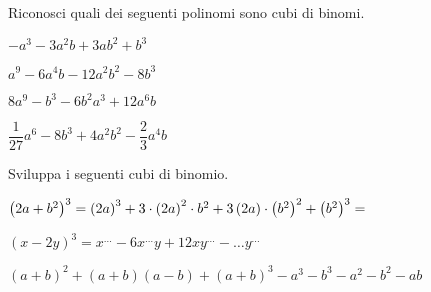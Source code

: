 \subsubsection*{}

\begin{esercizio}
 \label{ese:11.24}
Riconosci quali dei seguenti polinomi sono cubi di binomi.
\TabPositions{5cm}
\begin{enumeratea}
 \item \(-a^{3}-3a^{2}b+3{ab}^{2}+b^{3}\) \tab\boxSi\quad\boxNo
 \item \(a^{9}-6a^{4}b-12a^{2}b^{2}-8b^{3}\) \tab\boxSi\quad\boxNo
 \item \(8a^{9}-b^{3}-6b^{2}a^{3}+12a^{6}b\) \tab\boxSi\quad\boxNo
 \item \(\dfrac{1}{27}a^{6}-8b^{3}+4a^{2}b^{2}-\dfrac{2}{3}a^{4}b\) 
\tab\boxSi\quad\boxNo
\end{enumeratea}
\end{esercizio}

\begin{esercizio}
 \label{ese:11.25}
 Sviluppa i seguenti cubi di binomio.

 \begin{enumeratea}
\item \( 
\left(2a+b^{2}\right)^{3}=\left(2a\right)^{3}+3\cdot\left(2a\right)^{2}\cdot 
b^{2}+3\left(2a\right)\cdot\left(b^{2}\right)^{2}+\left(b^{2}\right)^{3}
=\dotfill~\)
\item \(\left(x-2y\right)^{3}=x^{\ldots }-6x^{\ldots }y+12{xy}^{\ldots}-\ldots 
y^{\ldots }\)
\item \((a+b)^{2}+(a+b)(a-b)+(a+b)^{3}-a^{3}-b^{3}-a^{2}-b^{2}-{ab}\)
\end{enumeratea}
\end{esercizio}

